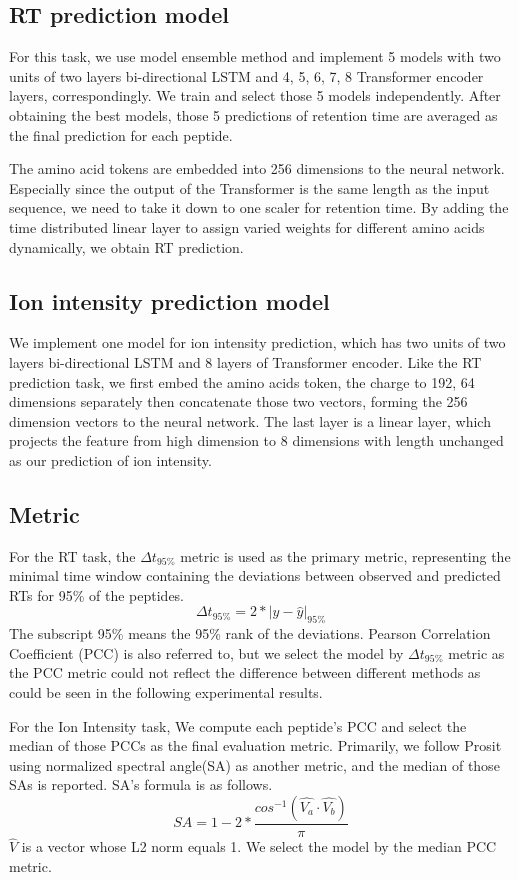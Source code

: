 \subsection{RT prediction model}
For this task, we use model ensemble method and implement
5 models with two units of two layers bi-directional LSTM and 4, 5, 6, 7, 8 Transformer encoder layers, correspondingly. We train and select those 5 models independently. After obtaining the best models, those 5 predictions of retention time are averaged as the final prediction for each peptide.

The amino acid tokens are embedded into 256 dimensions to the neural network.
Especially since the output of the Transformer is the same length as the input sequence, we need to take it down to one scaler for retention time. By adding the time distributed linear layer to assign varied weights for different amino acids dynamically, we obtain RT prediction.


\subsection{Ion intensity prediction model}

We implement one model for ion intensity prediction, which has two units of two layers bi-directional LSTM and 8 layers of Transformer encoder. Like the RT prediction task, we first embed the amino acids token, the charge to 192, 64 dimensions separately then concatenate those two vectors, forming the 256 dimension vectors to the neural network. The last layer is a linear layer, which projects the feature from high dimension to 8 dimensions with length unchanged as our prediction of ion intensity.



\subsection{Metric}
For the RT task, the $\Delta$$t_{95\%}$ metric is used as the primary metric, representing the minimal time window containing the deviations between observed and predicted RTs for 95\% of the peptides.
\[ \Delta t_{95\%} = 2 * | y - \hat{y} |_{95\%} \]
The subscript 95\% means the 95\% rank of the deviations.
Pearson Correlation Coefficient (PCC) is also referred to, but we select the model by $\Delta$$t_{95\%}$ metric as the PCC metric could not reflect the difference between different methods as could be seen in the following experimental results.

For the Ion Intensity task, We compute each peptide's PCC and select the median of those PCCs as the final evaluation metric. Primarily, we follow Prosit~\cite{gessulat2019prosit} using normalized
spectral angle(SA) as another metric, and the median of those SAs is reported.
SA's formula is as follows.
\[ SA = 1 - 2 * \frac{cos^{-1}(\hat{V_a}\cdot\hat{V_b})}{\pi} \]
$\hat{V}$ is a vector whose L2 norm equals 1. We select the model by the median PCC metric.